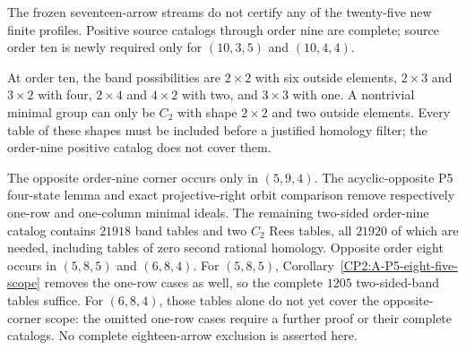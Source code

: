 \begin{remark*}
The frozen seventeen-arrow streams do not certify any of
the twenty-five new finite profiles. Positive source catalogs
through order nine are complete; source order ten is newly
required only for $(10,3,5)$ and $(10,4,4)$.

At order ten, the band possibilities are $2\times2$ with
six outside elements, $2\times3$ and $3\times2$ with four,
$2\times4$ and $4\times2$ with two, and $3\times3$ with
one. A nontrivial minimal group can only be $C_2$ with
shape $2\times2$ and two outside elements. Every table of
these shapes must be included before a justified homology
filter; the order-nine positive catalog does not cover them.

The opposite order-nine corner occurs only in $(5,9,4)$.
The acyclic-opposite P5 four-state lemma and exact
projective-right orbit comparison remove respectively
one-row and one-column minimal ideals. The remaining
two-sided order-nine catalog contains $21918$ band tables
and two $C_2$ Rees tables, all $21920$ of which are needed,
including tables of zero second rational homology.
Opposite order eight occurs in $(5,8,5)$ and $(6,8,4)$.
For $(5,8,5)$, Corollary~\ref{CP2:A-P5-eight-five-scope}
removes the one-row cases as well, so the complete $1205$
two-sided-band tables suffice. For $(6,8,4)$, those tables
alone do not yet cover the opposite-corner scope: the
omitted one-row cases require a further proof or their
complete catalogs.
No complete eighteen-arrow exclusion is asserted here.
\end{remark*}
